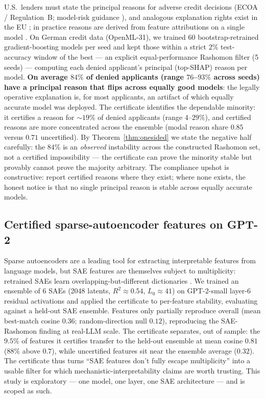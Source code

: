 \documentclass[10pt]{article}
\begin{document}
U.S.\ lenders must state the principal reasons for adverse credit decisions (ECOA /
Regulation~B; model-risk guidance \citep{occ2011sr117}), and analogous explanation
rights exist in the EU \citep{euaiact2024}; in practice reasons are derived from feature
attributions on a single model \citep{selbst2018intuitive,ustun2019actionable}. On
German credit data (OpenML-31), we trained 60 bootstrap-retrained gradient-boosting
models per seed and kept those within a strict $2\%$ test-accuracy window of the best
--- an explicit equal-performance Rashomon filter (5 seeds) --- computing each denied
applicant's principal (top-SHAP) reason per model. \textbf{On average $84\%$ of denied applicants (range
$76$--$93\%$ across seeds) have a principal reason that flips across equally good
models}: the legally operative explanation is, for most applicants, an artifact of which
equally accurate model was deployed. The certificate identifies the dependable
minority: it certifies a reason for ${\sim}19\%$ of denied applicants (range
$4$--$29\%$), and certified reasons are more concentrated across the ensemble (modal
reason share $0.85$ versus $0.71$ uncertified). By Theorem~\ref{thm:onesided} we state
the negative half carefully: the $84\%$ is an \emph{observed} instability across the
constructed Rashomon set, not a certified impossibility --- the certificate can prove
the minority stable but provably cannot prove the majority arbitrary. The compliance
upshot is constructive: report certified reasons where they exist; where none exists,
the honest notice is that no single principal reason is stable across equally accurate
models.

\subsection{Certified sparse-autoencoder features on GPT-2}
\label{sec:sae}

Sparse autoencoders are a leading tool for extracting interpretable features from
language models, but SAE features are themselves subject to multiplicity: retrained SAEs
learn overlapping-but-different dictionaries \citep{paulo2025sae,meloux2025everything}.
We trained an ensemble of 6 SAEs (2048 latents, $R^2\approx0.54$, $L_0\approx41$) on
GPT-2-small layer-6 residual activations and applied the certificate to per-feature
stability, evaluating against a held-out SAE ensemble. Features only partially reproduce
overall (mean best-match cosine $0.36$; random-direction null $0.12$), reproducing the
SAE-Rashomon finding at real-LLM scale. The certificate separates, out of sample: the
$9.5\%$ of features it certifies transfer to the held-out ensemble at mean cosine
$0.81$ ($88\%$ above $0.7$), while uncertified features sit near the ensemble average
($0.32$). The certificate thus turns ``SAE features don't fully escape multiplicity''
into a usable filter for which mechanistic-interpretability claims are worth trusting.
This study is exploratory --- one model, one layer, one SAE architecture --- and is
scoped as such.
\end{document}

